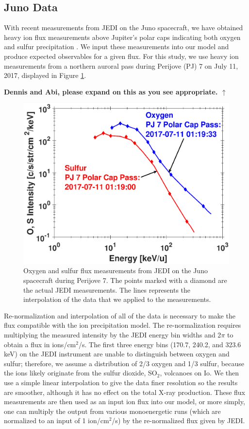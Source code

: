 \documentclass[draft]{agujournal2018}
\begin{document}
\subsection{Juno Data}

With recent measurements from JEDI \citep{mauk2017ssr} on the Juno spacecraft, we have obtained heavy ion flux measurements above Jupiter's polar caps indicating both oxygen and sulfur precipitation \citep{haggerty2017,clark2017a,clark2017b}.
We input these measurements into our model and produce expected observables for a given flux.
For this study, we use heavy ion measurements from a northern auroral pass during Perijove (PJ) 7 on July 11, 2017, displayed in Figure \ref{fig:JEDIFlux}.

\noindent\textbf{\Large Dennis and Abi, please expand on this as you see appropriate. $\uparrow$}

\begin{figure}[ht]
    \centering
    \includegraphics[width=\textwidth]{Figures/O+S_PJ7.eps}
    \caption{Oxygen and sulfur flux measurements from JEDI on the Juno spacecraft during Perijove 7. The points marked with a diamond are the actual JEDI measurements. The lines represents the interpolation of the data that we applied to the measurements.}
    \label{fig:JEDIFlux}
\end{figure}

Re-normalization and interpolation of all of the data is necessary to make the flux compatible with the ion precipitation model.
The re-normalization requires multiplying the measured intensity by the JEDI energy bin widths \citep{mauk2017ssr} and 2$\pi$ to obtain a flux in ions/cm$^2$/s.
The first three energy bins (170.7, 240.2, and 323.6 keV) on the JEDI instrument are unable to distinguish between oxygen and sulfur; therefore, we assume a distribution of 2/3 oxygen and 1/3 sulfur, because the ions likely originate from the sulfur dioxide, SO$_2$, volcanoes on Io.
We then use a simple linear interpolation to give the data finer resolution so the results are smoother, although it has no effect on the total X-ray production.
These flux measurements are then used as an input ion flux into our model, or more simply, one can multiply the output from various monoenergetic runs (which are normalized to an input of 1 ion/cm$^2$/s) by the re-normalized flux given by JEDI.
\end{document}
